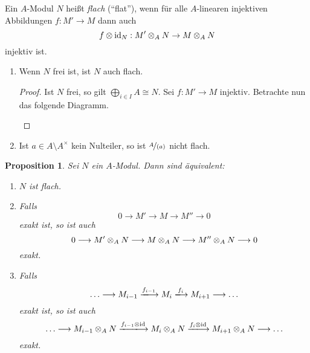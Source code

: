 \documentclass[12pt,a4paper]{scrartcl}
\theoremstyle{cplain}
\newtheorem{prop}[thmcounter]{Proposition}
\theoremstyle{cdef}
\begin{document}
\begin{defi}
	Ein $A$-Modul $N$ heißt \emph{flach} (\enquote{flat}), wenn für alle $A$-linearen injektiven Abbildungen $f: M' \to M$ dann auch \[ f \otimes \operatorname{id}_N : M' \otimes_A N \to M \otimes_A N \] injektiv ist.
\end{defi}
\begin{bsp}
	\leavevmode
	\begin{enumerate}
		\item Wenn $N$ frei ist, ist $N$ auch flach.
		\begin{proof}
			Ist $N$ frei, so gilt $\bigoplus_{i \in I} A \cong N$. Sei $f: M' \to M$ injektiv. Betrachte nun das folgende Diagramm.
			\begin{figure}[H]
				\centering
			\end{figure}
		\end{proof}
		\item Ist $a \in A \setminus A^{\times}$ kein Nulteiler, so ist $\nicefrac{A}{(a)}$ nicht flach.
	\end{enumerate}
\end{bsp}
\begin{prop}
	Sei $N$ ein $A$-Modul. Dann sind äquivalent:
	\begin{enumerate}
		\item $N$ ist flach. \label{prop:flach:i}
		\item Falls \[ 0 \longrightarrow M' \longrightarrow M \longrightarrow M'' \longrightarrow 0 \] exakt ist, so ist auch \[ 0 \longrightarrow M' \otimes_A N \longrightarrow M \otimes_A N \longrightarrow M'' \otimes_A N \longrightarrow 0 \] exakt. \label{prop:flach:ii}
		\item Falls \[ \ldots \longrightarrow M_{i-1} \xlongrightarrow{f_{i-1}} M_i \xlongrightarrow{f_{i}} M_{i+1} \longrightarrow \ldots \] exakt ist, so ist auch \[ \ldots \longrightarrow M_{i-1}\tp_A N \xlongrightarrow{f_{i-1}\tp\id} M_i\tp_A N \xlongrightarrow{f_{i}\tp\id} M_{i+1}\tp_A N \longrightarrow \ldots \] exakt. \label{prop:flach:iii}
	\end{enumerate}
\end{prop}
\end{document}
